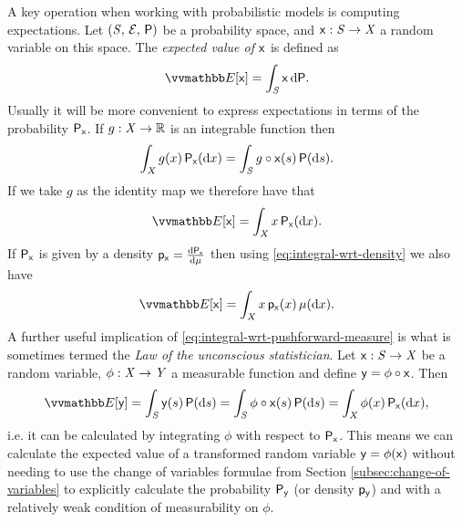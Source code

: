 A key operation when working with probabilistic models is computing expectations. Let $(\mathit{S},\,\mathcal{E},\,\mathsf{P})$ be a probability space, and $\mathsf{x} : \mathit{S} \to \mathit{X}$ a random variable on this space. The \emph{expected value of $\mathsf{x}$} is defined as
\begin{equation}\label{eq:expectation-general}
  \expc{\rvar{x}} = \int_{\set{S}} \rvar{x}\,\dr\probability.
\end{equation}
Usually it will be more convenient to express expectations in terms of the probability $\mathsf{P}_{\mathsf{x}}$. If $g : \mathit{X} \to \mathbb{R}$ is an integrable function then
\begin{equation}\label{eq:integral-wrt-pushforward-measure}
  \int_{\mathit{X}} g(x) \,\mathsf{P}_{\mathsf{x}}(\mathrm{d} x) =
  \int_{\mathit{S}} g \circ \mathsf{x}(s) \,\mathsf{P}(\mathrm{d} s).
\end{equation}
If we take $g$ as the identity map we therefore have that
\begin{equation}\label{eq:expectation-pushfoward}
  \expc{\rvar{x}} = \int_{\set{X}} x \,\prob{\rvar{x}}(\dr x).
\end{equation}
If $\mathsf{P}_{\mathsf{x}}$ is given by a density $\mathsf{p}_{\mathsf{x}} = \frac{\mathrm{d} \mathsf{P}_{\mathsf{x}}}{\mathrm{d} \mu}$ then using \eqref{eq:integral-wrt-density} we also have
\begin{equation}\label{eq:expectation-density}
  \expc{\rvar{x}} = \int_{\set{X}} x \,\pden{\rvar{x}}(x) \,\mu(\dr x).
\end{equation} %
A further useful implication of \eqref{eq:integral-wrt-pushforward-measure} is what is sometimes termed the \emph{Law of the unconscious statistician}. Let $\mathsf{x} : \mathit{S} \to \mathit{X}$ be a random variable, $\phi : \mathit{X} \to \mathit{Y}$ a measurable function and define $\mathsf{y} = \phi \circ \mathsf{x}$. Then %
\begin{equation}\label{eq:law-of-the-unconscious-statistician}
  \expc{\rvar{y}} = \int_{\set{S}} \rvar{y}(s) \,\probability(\dr s)
  = \int_{\set{S}} \phi \circ \rvar{x}(s) \,\probability(\dr s)
  = \int_{\set{X}} \phi(x) \,\prob{\rvar{x}}(\dr x),
\end{equation}
i.e. it can be calculated by integrating $\phi$ with respect to $\mathsf{P}_{\mathsf{x}}$. This means we can calculate the expected value of a transformed random variable $\mathsf{y} = \phi(\mathsf{x})$ without needing to use the change of variables formulae from Section \ref{subsec:change-of-variables} to explicitly calculate the probability $\mathsf{P}_{\mathsf{y}}$ (or density $\mathsf{p}_{\mathsf{y}}$) and with a relatively weak condition of measurability on $\phi$.

